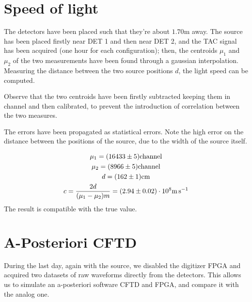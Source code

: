 \documentclass[11pt,a4 paper]{article}
\let\oldfrac\frac
\renewcommand{\frac}[3][d]{\ifthenelse{\equal{#1}{d}}{\oldfrac{#2}{#3}}{\nicefrac{#2}{#3}}}
\begin{document}
\section{Speed of light}
The detectors have been placed such that they're about $1.70\si{\metre}$ away. The  source has been placed firstly near DET 1 and then near DET 2, and the TAC signal has been acquired (one hour for each configuration); then, the centroids $\mu_1$ and $\mu_2$ of the two measurements have been found through a gaussian interpolation. Measuring the distance between the two source positions $d$, the light speed can be computed.

Observe that the two centroids have been firstly subtracted keeping them in channel and then calibrated, to prevent the introduction of correlation between the two measures.

The errors have been propagated as statistical errors. Note the high error on the distance between the positions of the source, due to the width of the source itself.

\begin{gather*}
    \mu_1 = (16433 \pm 5)\si{channel}\\
    \mu_2 = (8966 \pm 5)\si{channel} \\
    d = (162 \pm 1) \si{\centi\metre} \\
    c = \frac{2d}{(\mu_1-\mu_2)m} = (2.94 \pm 0.02 )\cdot 10^8 \si{\metre\per\second}
\end{gather*}
The result is compatible with the true value.

\section{A-Posteriori CFTD}
During the last day, again with the  source, we disabled the digitizer FPGA and acquired two datasets of raw waveforms directly from the detectors. This allows us to simulate an a-posteriori software CFTD and FPGA, and compare it with the analog one.
\end{document}
